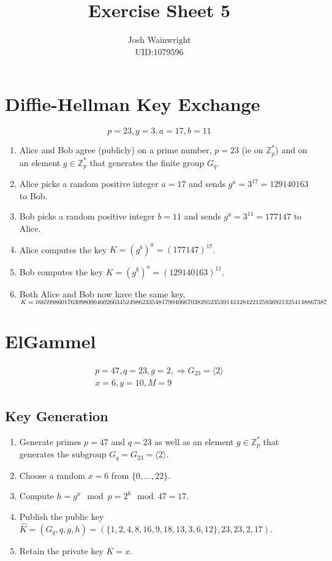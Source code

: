 \documentclass[11pt]{article} %
\author{Josh Wainwright \\ UID:1079596}
\title{Exercise Sheet 5 }
\date{}
\begin{document}
\maketitle

\section{Diffie-Hellman Key Exchange}
\begin{equation}
	p=23, g=3, a=17, b=11
\end{equation}
\begin{enumerate}
	\item Alice and Bob agree (publicly) on a prime number, $p=23$ (ie on
		$\mathbb{Z}^{*}_{p}$) and on an element $g \in \mathbb{Z}^{*}_{p}$ that
		generates the finite group  $G_q$.
	\item Alice picks a random positive integer $a=17$ and sends $g^a = 3^{17}
		= 129140163$ to Bob.
	\item Bob picks a random positive integer $b=11$ and sends $g^a = 3^{11} =
		177147$ to Alice.
	\item Alice computes the key $K = {(g^b)}^a = {(177147)}^{17}$.
	\item Bob computes the key $K = {(g^b)}^a = {(129140163)}^{11}$.
	\item Both Alice and Bob now have the same key, $K =
		1\-6\-6\-5\-9\-9\-8\-6\-0\-1\-7\-6\-3\-0\-9\-8\-0\-0\-0\-4\-6\-0\-2\-6\-6\-3\-4\-5\-2\-4\-9\-8\-6\-2\-3\-3\-5\-4\-8\-1\-7\-9\-0\-4\-0\-6\-6\-7\-0\-3\-8\-2\-9\-5\-2\-3\-5\-3\-9\-1\-4\-2\-4\-2\-8\-4\-2\-2\-1\-2\-5\-9\-3\-6\-9\-2\-1\-3\-2\-5\-4\-1\-4\-8\-8\-6\-7\-3\-8\-7$
\end{enumerate}

\section{ElGammel}
\begin{align}
	p=47, q=23, g=2, \Rightarrow G_{23} = \langle 2 \rangle \\
	x=6, y=10, M=9
\end{align}
\subsection{Key Generation}
\begin{enumerate}
	\item Generate primes $p=47$ and $q=23$ as well as an element $g \in
		\mathbb{Z}^{*}_{p}$ that generates the subgroup $G_{q} = G_{23} =
		\langle 2 \rangle$.
	\item Choose a random $x=6$ from $\{0, \ldots, 22\}$.
	\item Compute $h=g^x \mod p = 2^6 \mod 47 = 17$.
	\item Publish the public key $\hat{K} = (G_q, q, g, h) =
		(\{1,2,4,8,16,9,18, 13, 3, 6, 12\}, 23, 23, 2, 17)$.
	\item Retain the private key $K=x$.
\end{enumerate}
\end{document}
